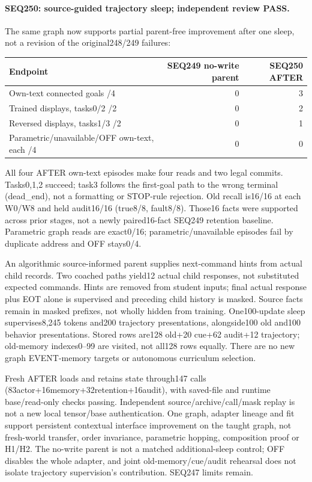 \documentclass{article}
\begin{document}
\paragraph{SEQ250: source-guided trajectory sleep; independent review PASS.}
The same graph now supports partial parent-free improvement after one sleep,
not a revision of the original248/249 failures:
\begin{center}
\small
\begin{tabular}{lrr}
\toprule
Endpoint & SEQ249 no-write parent & SEQ250 AFTER \\
\midrule
Own-text connected goals /4 & 0 & 3 \\
Trained displays, tasks0/2 /2 & 0 & 2 \\
Reversed displays, tasks1/3 /2 & 0 & 1 \\
Parametric/unavailable/OFF own-text, each /4 & 0 & 0 \\
\bottomrule
\end{tabular}
\end{center}
All four AFTER own-text episodes make four reads and two legal commits.
Tasks0,1,2 succeed; task3 follows the first-goal path to the wrong terminal
(dead\_end), not a formatting or STOP-rule rejection. Old recall is16/16 at
each W0/W8 and held audit16/16 (true8/8, fault8/8). Those16 facts were supported
across prior stages, not a newly paired16-fact SEQ249 retention baseline.
Parametric graph reads are exact0/16; parametric/unavailable episodes fail by
duplicate address and OFF stays0/4.

An algorithmic source-informed parent supplies next-command hints from actual
child records. Two coached paths yield12 actual child responses, not substituted
expected commands. Hints are removed from student inputs; final actual response
plus EOT alone is supervised and preceding child history is masked. Source
facts remain in masked prefixes, not wholly hidden from training. One100-update
sleep supervises8,245 tokens and200 trajectory presentations, alongside100 old
and100 behavior presentations. Stored rows are128 old+20 cue+62 audit+12
trajectory; old-memory indexes0--99 are visited, not all128 rows equally.
There are no new graph EVENT-memory targets or autonomous curriculum selection.

Fresh AFTER loads and retains state
through147 calls (83actor+16memory+32retention+16audit), with saved-file and
runtime base/read-only checks passing. Independent source/archive/call/mask
replay is not a new local tensor/base authentication. One graph, adapter lineage
and fit support persistent contextual interface improvement on the taught graph,
not fresh-world transfer, order invariance, parametric hopping, composition
proof or H1/H2. The no-write parent is not a matched additional-sleep control;
OFF disables the whole adapter, and joint old-memory/cue/audit rehearsal does
not isolate trajectory supervision's contribution. SEQ247 limits remain.
\end{document}
